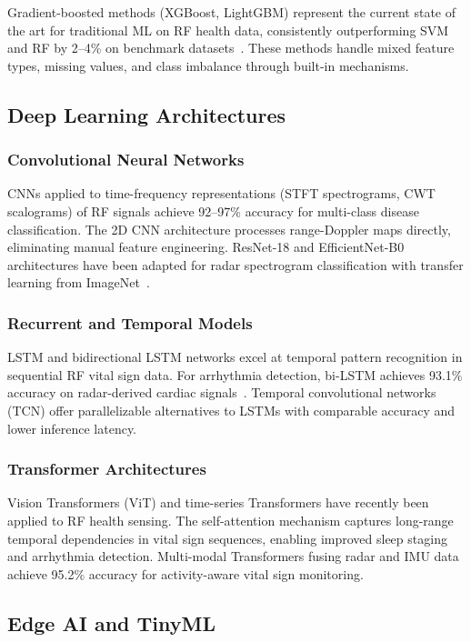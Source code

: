 \documentclass[journal,twoside]{IEEEtran}
\begin{document}
Gradient-boosted methods (XGBoost, LightGBM) represent the current state of the art for traditional ML on RF health data, consistently outperforming SVM and RF by 2--4\% on benchmark datasets~\cite{ref_bp_sensors_ml2025}. These methods handle mixed feature types, missing values, and class imbalance through built-in mechanisms.

\subsection{Deep Learning Architectures}

\subsubsection{Convolutional Neural Networks}
CNNs applied to time-frequency representations (STFT spectrograms, CWT scalograms) of RF signals achieve 92--97\% accuracy for multi-class disease classification. The 2D CNN architecture processes range-Doppler maps directly, eliminating manual feature engineering. ResNet-18 and EfficientNet-B0 architectures have been adapted for radar spectrogram classification with transfer learning from ImageNet~\cite{ref_iradar2024}.

\subsubsection{Recurrent and Temporal Models}
LSTM and bidirectional LSTM networks excel at temporal pattern recognition in sequential RF vital sign data. For arrhythmia detection, bi-LSTM achieves 93.1\% accuracy on radar-derived cardiac signals~\cite{ref_mmwave_arrhythmia2023}. Temporal convolutional networks (TCN) offer parallelizable alternatives to LSTMs with comparable accuracy and lower inference latency.

\subsubsection{Transformer Architectures}
Vision Transformers (ViT) and time-series Transformers have recently been applied to RF health sensing. The self-attention mechanism captures long-range temporal dependencies in vital sign sequences, enabling improved sleep staging and arrhythmia detection. Multi-modal Transformers fusing radar and IMU data~\cite{ref_multimodal2024} achieve 95.2\% accuracy for activity-aware vital sign monitoring.

\subsection{Edge AI and TinyML}
\end{document}
